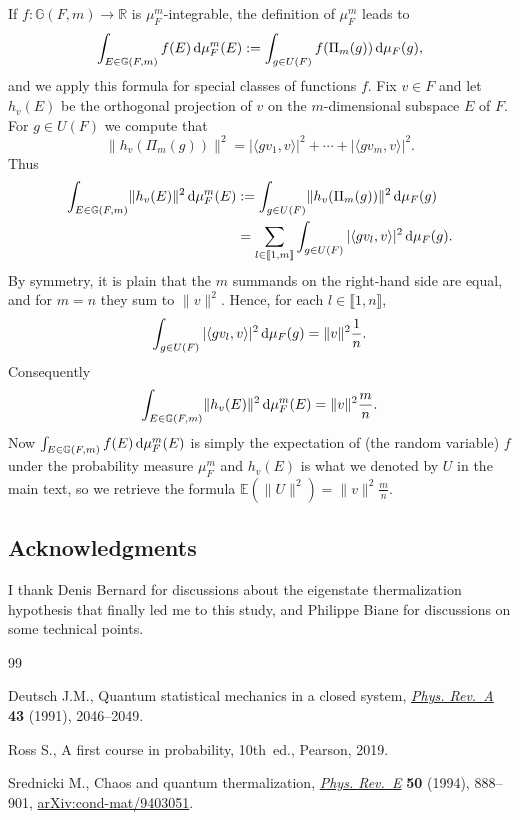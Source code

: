 \documentclass[pdftex]{sigma}%
\newcommand{\norm}[1]{\lVert #1\rVert}
\newcommand{\aver}[1]{\langle #1 \rangle}
\newcommand{\intt}[1]{\llbracket #1 \rrbracket}
\newcommand{\expec}[1]{\mathbb{E}\left(#1\right)}
\begin{document}
If $f\colon \mathbb{G}(F,m)\to \mathbb{R}$ is $\mu_F^m$-integrable, the definition of $\mu_F^m$ leads to
\[
\int_{E\in \mathbb{G}(F,m)} f(E) \, {\rm d}\mu_F^m(E):= \int_{g\in U(F)} f(\Pi_m(g)) \, {\rm d}\mu_F(g),
\]
and we apply this formula for special classes of functions $f$. Fix $v\in F$ and let $h_v(E)$ be the orthogonal projection of $v$ on the $m$-dimensional subspace $E$ of $F$. For $g\in U(F)$ we compute that
\[
\norm{h_v(\Pi_m(g))}^2 = |\aver{gv_1 ,v}|^2 +\cdots+ |\aver{gv_m ,v}|^2.
\]
Thus
\begin{align*}
\int_{E\in \mathbb{G}(F,m)} \norm{h_v(E)}^2 \, {\rm d}\mu_F^m(E)&:= \int_{g\in U(F)} \norm{h_v(\Pi_m(g))}^2 \, {\rm d}\mu_F(g)
\\
&
=\sum_{l\in \intt{1,m}} \int_{g\in U(F)} |\aver{gv_l ,v}|^2 \, {\rm d}\mu_F(g).
\end{align*}
By symmetry, it is plain that the $m$ summands on the right-hand side are equal, and for $m=n$ they sum to $\norm{v}^2$. Hence, for each $l\in \intt{1,n}$,
\[
\int_{g\in U(F)} |\aver{gv_l ,v }|^2 \, {\rm d}\mu_F(g) =\norm{v}^2\frac{1}{n}.
\]
Consequently
\[
\int_{E\in \mathbb{G}(F,m)} \norm{h_v(E)}^2 \, {\rm d}\mu_F^m(E)=\norm{v}^2\frac{m}{n}.
\]
Now $\int_{E\in \mathbb{G}(F,m)} f (E) \, {\rm d}\mu_F^m(E)$ is simply the expectation of (the random variable) $f$ under the probability measure $\mu_F^m$ and $h_v(E)$ is what we denoted by $U$ in the main text, so we retrieve the formula $\expec{\norm{U}^2}=\norm{v}^2\frac{m}{n}$.

\subsection*{Acknowledgments}

I thank Denis Bernard for discussions about the eigenstate thermalization hypothesis that finally led me to this study, and Philippe Biane for discussions on some technical points.

\begin{thebibliography}{99}
\footnotesize\itemsep=0pt

Deutsch J.M., Quantum statistical mechanics in a closed system, \href{https://doi.org/10.1103/PhysRevA.43.2046}{\textit{Phys.
 Rev.~A}} \textbf{43} (1991), 2046--2049.

Ross S., A first course in probability, 10th~ed., Pearson, 2019.

Srednicki M., Chaos and quantum thermalization, \href{https://doi.org/10.1103/PhysRevE.50.888}{\textit{Phys. Rev.~E}}
 \textbf{50} (1994), 888--901, \href{https://arxiv.org/abs/cond-mat/9403051}{arXiv:cond-mat/9403051}.

\end{thebibliography}\LastPageEnding
\end{document}
